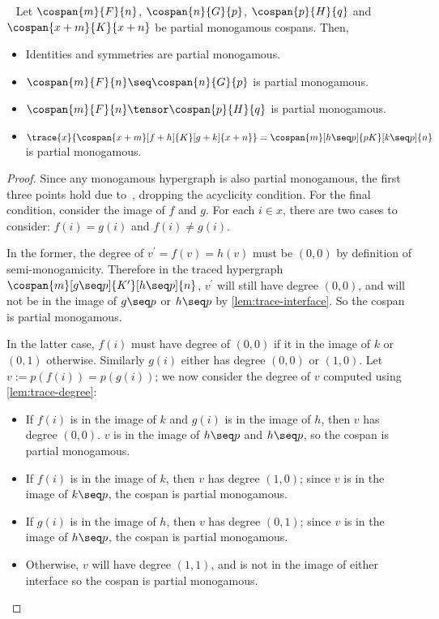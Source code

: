 \begin{lemma}~\label{lem:partial monogamous-ops}
    Let \(\cospan{m}{F}{n}\), \(\cospan{n}{G}{p}\), \(\cospan{p}{H}{q}\) and
    \(\cospan{x+m}{K}{x+n}\) be partial monogamous cospans.
    Then,
    \begin{itemize}
        \item Identities and symmetries are partial monogamous.
        \item \(\cospan{m}{F}{n} \seq \cospan{n}{G}{p}\) is partial monogamous.
        \item \(\cospan{m}{F}{n} \tensor \cospan{p}{H}{q}\) is partial
        monogamous.
        \item \(
            \trace{x}{\cospan{x+m}[f+h]{K}[g+k]{x+n}}
            =
            \cospan{m}[h \seq p]{pK}[k \seq p]{n}
        \) is partial monogamous.
    \end{itemize}
\end{lemma}
\begin{proof}
    Since any monogamous hypergraph is also partial monogamous, the first three
    points hold due to~\cite[Prop.16]{bonchi2022string}, dropping the acyclicity
    condition.
    For the final condition, consider the image of \(f\) and \(g\).
    For each \(i \in x\), there are two cases to consider: \(f(i) = g(i)\) and
    \(f(i) \neq g(i)\).

    In the former, the degree of \(v^\prime = f(v) = h(v)\) must be \((0,0)\)
    by definition of semi-monogamicity.
    Therefore in the traced hypergraph \(
        \cospan{m}[g \seq p]{K^\prime}[h \seq p]{n}
    \), \(v^\prime\) will still have degree \((0,0)\), and will not be in the
    image of \(g \seq p\) or \(h \seq p\) by \cref{lem:trace-interface}.
    So the cospan is partial monogamous.

    In the latter case, \(f(i)\) must have degree of \((0,0)\) if it in the
    image of \(k\) or \((0,1)\) otherwise.
    Similarly \(g(i)\) either has degree \((0,0)\) or \((1,0)\).
    Let \(v := p(f(i)) = p(g(i))\); we now consider the degree of \(v\) computed
    using \cref{lem:trace-degree}:
    \begin{itemize}
        \item If \(f(i)\) is in the image of \(k\) and \(g(i)\) is in the image
                of \(h\), then \(v\) has degree \((0,0)\).
                \(v\) is in the image of \(h \seq p\) and \(h \seq p\), so the
                cospan is partial monogamous.
        \item If \(f(i)\) is in the image of \(k\), then \(v\) has degree
                \((1, 0)\); since \(v\) is in the image of \(k \seq p\), the
                cospan is partial monogamous.
        \item If \(g(i)\) is in the image of \(h\), then \(v\) has degree
                \((0, 1)\); since \(v\) is in the image of \(h \seq p\), the
                cospan is partial monogamous.
        \item Otherwise, \(v\) will have degree \((1, 1)\), and is not in the
                image of either interface so the cospan is partial monogamous.
    \end{itemize}
\end{proof}

